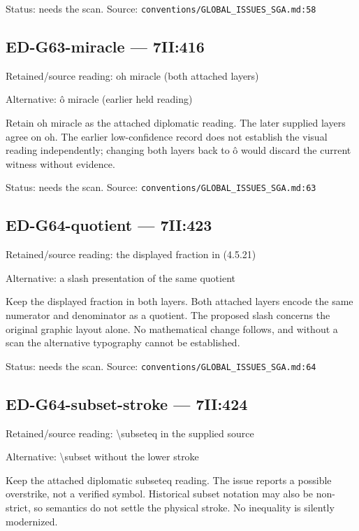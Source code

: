 Status: needs the scan. Source: \nolinkurl{conventions/GLOBAL_ISSUES_SGA.md:58}

\subsection*{ED-G63-miracle — 7II:416}

Retained/source reading: oh miracle (both attached layers)

Alternative: ô miracle (earlier held reading)

Retain oh miracle as the attached diplomatic reading. The later supplied layers agree on oh. The earlier low-confidence record does not establish the visual reading independently; changing both layers back to ô would discard the current witness without evidence.

Status: needs the scan. Source: \nolinkurl{conventions/GLOBAL_ISSUES_SGA.md:63}

\subsection*{ED-G64-quotient — 7II:423}

Retained/source reading: the displayed fraction in (4.5.21)

Alternative: a slash presentation of the same quotient

Keep the displayed fraction in both layers. Both attached layers encode the same numerator and denominator as a quotient. The proposed slash concerns the original graphic layout alone. No mathematical change follows, and without a scan the alternative typography cannot be established.

Status: needs the scan. Source: \nolinkurl{conventions/GLOBAL_ISSUES_SGA.md:64}

\subsection*{ED-G64-subset-stroke — 7II:424}

Retained/source reading: \textbackslash{}subseteq in the supplied source

Alternative: \textbackslash{}subset without the lower stroke

Keep the attached diplomatic subseteq reading. The issue reports a possible overstrike, not a verified symbol. Historical subset notation may also be non-strict, so semantics do not settle the physical stroke. No inequality is silently modernized.

